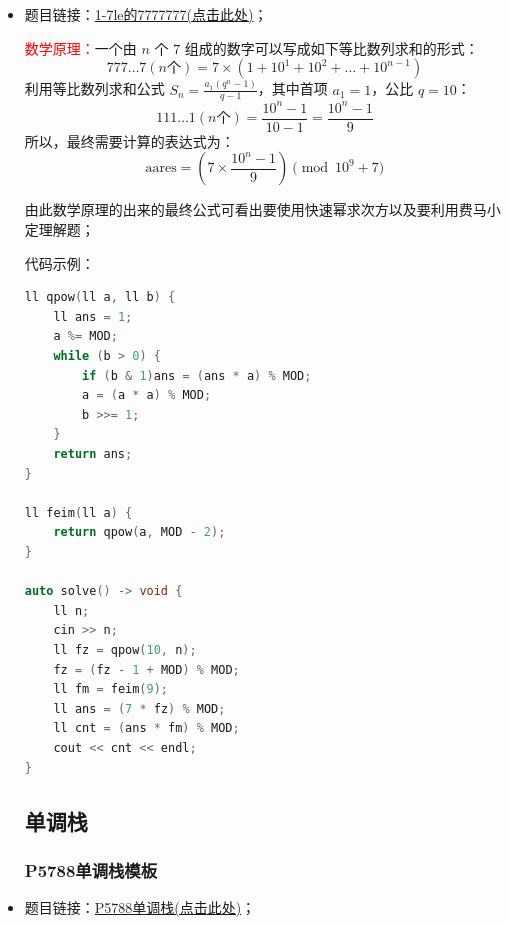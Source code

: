 \begin{itemize}
代码示例:\\
\begin{lstlisting}[language=C++]
void solve() {
	ull k, n;
	cin >> k >> n;
	ull ans = 0, power = 1;
	while (n > 0) {
		if (n & 1) {  //看n的二进制最后一位是否是1，是就加幂；
			ans += power;
		}
		power *= k;
		n >>= 1; //右移更新最后一位二进制,丢掉原来的最后一位
	}
	cout << ans << endl;
}
\end{lstlisting}
\subsection{快速幂}
\subsubsection{2026天梯赛选拔1-7}
\item 题目链接：\href{https://pintia.cn/problem-sets/2030339464381566976/exam/problems/type/7?problemSetProblemId=2030339464444481542}{1-7le的7777777(点击此处)}；

\textcolor{red}{数学原理：}一个由 $n$ 个 $7$ 组成的数字可以写成如下等比数列求和的形式：$$777\dots7 (n\text{个}) = 7 \times (1 + 10^1 + 10^2 + \dots + 10^{n-1})$$利用等比数列求和公式 $S_n = \frac{a_1(q^n - 1)}{q - 1}$，其中首项 $a_1 = 1$，公比 $q = 10$：$$111\dots1 (n\text{个}) = \frac{10^n - 1}{10 - 1} = \frac{10^n - 1}{9}$$所以，最终需要计算的表达式为：$$\text{aares} = \left( 7 \times \frac{10^n - 1}{9} \right) \pmod{10^9 + 7}$$

由此数学原理的出来的最终公式可看出要使用快速幂求次方以及要利用费马小定理解题；

代码示例：\\
\begin{lstlisting}[language=C++]
ll qpow(ll a, ll b) {
	ll ans = 1;
	a %= MOD;
	while (b > 0) {
		if (b & 1)ans = (ans * a) % MOD;
		a = (a * a) % MOD;
		b >>= 1;
	}
	return ans;
}

ll feim(ll a) {
	return qpow(a, MOD - 2);
}

auto solve() -> void {
	ll n;
	cin >> n;
	ll fz = qpow(10, n);
	fz = (fz - 1 + MOD) % MOD;
	ll fm = feim(9);
	ll ans = (7 * fz) % MOD;
	ll cnt = (ans * fm) % MOD;
	cout << cnt << endl;
}
\end{lstlisting}
\subsection{单调栈}
\subsubsection{P5788单调栈模板}
\item 题目链接：\href{https://www.luogu.com.cn/problem/P5788}{P5788单调栈(点击此处)}；


\end{itemize}
